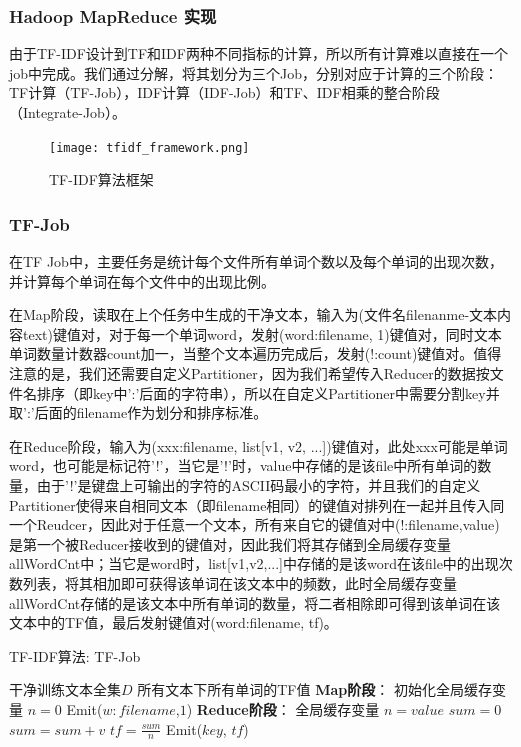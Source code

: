 \documentclass[lang=cn,11pt]{elegantpaper}
\begin{document}
\subsubsection{Hadoop MapReduce 实现}
由于TF-IDF设计到TF和IDF两种不同指标的计算，所以所有计算难以直接在一个job中完成。我们通过分解，将其划分为三个Job，分别对应于计算的三个阶段：TF计算（TF-Job），IDF计算（IDF-Job）和TF、IDF相乘的整合阶段（Integrate-Job）。

\begin{figure}[H]
	\centering
	\texttt{[image: tfidf\_framework.png]}
	\caption{TF-IDF算法框架 \label{fig:tfidf_framework}}
\end{figure}

\subsubsection{TF-Job}
在TF Job中，主要任务是统计每个文件所有单词个数以及每个单词的出现次数，并计算每个单词在每个文件中的出现比例。\par
在Map阶段，读取在上个任务中生成的干净文本，输入为(文件名filenanme-文本内容text)键值对，对于每一个单词word，发射(word:filename, 1)键值对，同时文本单词数量计数器count加一，当整个文本遍历完成后，发射(!:count)键值对。值得注意的是，我们还需要自定义Partitioner，因为我们希望传入Reducer的数据按文件名排序（即key中':'后面的字符串），所以在自定义Partitioner中需要分割key并取':'后面的filename作为划分和排序标准。\par
在Reduce阶段，输入为(xxx:filename, list[v1, v2, ...])键值对，此处xxx可能是单词word，也可能是标记符'!'，当它是'!'时，value中存储的是该file中所有单词的数量，由于'!'是键盘上可输出的字符的ASCII码最小的字符，并且我们的自定义Partitioner使得来自相同文本（即filename相同）的键值对排列在一起并且传入同一个Reudcer，因此对于任意一个文本，所有来自它的键值对中(!:filename,value)是第一个被Reducer接收到的键值对，因此我们将其存储到全局缓存变量allWordCnt中；当它是word时，list[v1,v2,...]中存储的是该word在该file中的出现次数列表，将其相加即可获得该单词在该文本中的频数，此时全局缓存变量allWordCnt存储的是该文本中所有单词的数量，将二者相除即可得到该单词在该文本中的TF值，最后发射键值对(word:filename, tf)。\par
\begin{algorithm}[H]
  \caption{TF-IDF算法: TF-Job}  
  \label{alg:Framwork}
  \begin{algorithmic}[1]
    \Require
    干净训练文本全集$D$
    \Ensure
    所有文本下所有单词的TF值
    \State \textbf{Map阶段}：
    \State 初始化全局缓存变量 $n=0$
    \EndFunction
        \State Emit($w:filename$,$1$)
      \EndFor
    \EndFunction
    \State \textbf{Reduce阶段}：
      \State 全局缓存变量 $n=value$
    \Else
      \State $sum=0$
        \State $sum = sum + v$
      \EndFor
      \State $tf = \frac{sum}{n}$
      \State Emit($key$, $tf$)
    \EndIf
    \EndFunction
  \end{algorithmic}
\end{algorithm}
\end{document}
